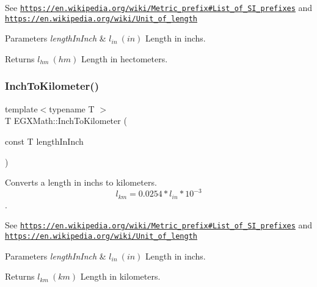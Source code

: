 See \href{https://en.wikipedia.org/wiki/Metric_prefix#List_of_SI_prefixes}{\tt https\+://en.\+wikipedia.\+org/wiki/\+Metric\+\_\+prefix\#\+List\+\_\+of\+\_\+\+S\+I\+\_\+prefixes} and \href{https://en.wikipedia.org/wiki/Unit_of_length}{\tt https\+://en.\+wikipedia.\+org/wiki/\+Unit\+\_\+of\+\_\+length} 
\begin{DoxyParams}{Parameters}
{\em length\+In\+Inch} & $ l_{in}\ (in)$ Length in inchs. \\
\hline
\end{DoxyParams}
\begin{DoxyReturn}{Returns}
$ l_{hm}\ (hm)$ Length in hectometers. 
\end{DoxyReturn}
\mbox{\label{group___e_g_x_math-_conversions-_length_conversions-_imperial-_inch-_s_i_ga8764c195dc365ed698383a0e59be1444}} 
\subsubsection{\texorpdfstring{Inch\+To\+Kilometer()}{InchToKilometer()}}
{\footnotesize\ttfamily template$<$typename T $>$ \\
T E\+G\+X\+Math\+::\+Inch\+To\+Kilometer (\begin{DoxyParamCaption}\item[{const T}]{length\+In\+Inch }\end{DoxyParamCaption})}



Converts a length in inchs to kilometers. \[ l_{km}=0.0254 * l_{in} * 10^{-3} \]. 

See \href{https://en.wikipedia.org/wiki/Metric_prefix#List_of_SI_prefixes}{\tt https\+://en.\+wikipedia.\+org/wiki/\+Metric\+\_\+prefix\#\+List\+\_\+of\+\_\+\+S\+I\+\_\+prefixes} and \href{https://en.wikipedia.org/wiki/Unit_of_length}{\tt https\+://en.\+wikipedia.\+org/wiki/\+Unit\+\_\+of\+\_\+length} 
\begin{DoxyParams}{Parameters}
{\em length\+In\+Inch} & $ l_{in}\ (in)$ Length in inchs. \\
\hline
\end{DoxyParams}
\begin{DoxyReturn}{Returns}
$ l_{km}\ (km)$ Length in kilometers. 
\end{DoxyReturn}
\mbox{\label{group___e_g_x_math-_conversions-_length_conversions-_imperial-_inch-_s_i_ga338a079a2861293f873274e82d140e14}} 
